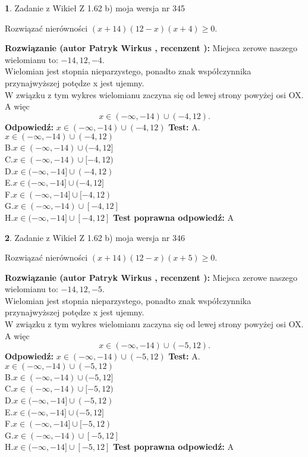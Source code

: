 \documentclass[12pt, a4paper]{article}
\theoremstyle{definition} %
\newtheorem{zad}{}
\newcommand{\zadStart}[1]{\begin{zad}#1\newline}
\newcommand{\zadStop}{\end{zad}}
\newcommand{\rozwStart}[2]{\noindent \textbf{Rozwiązanie (autor #1 , recenzent #2): }\newline}
\newcommand{\rozwStop}{\newline}
\newcommand{\odpStart}{\noindent \textbf{Odpowiedź:}\newline}
\newcommand{\odpStop}{\newline}
\newcommand{\testStart}{\noindent \textbf{Test:}\newline}
\newcommand{\testStop}{\newline}
\newcommand{\kluczStart}{\noindent \textbf{Test poprawna odpowiedź:}\newline}
\newcommand{\kluczStop}{\newline}
\begin{document}
\zadStart{Zadanie z Wikieł Z 1.62 b) moja wersja nr 345}

Rozwiązać nierówności $(x+14)(12-x)(x+4)\ge0$.
\zadStop
\rozwStart{Patryk Wirkus}{}
Miejsca zerowe naszego wielomianu to: $-14, 12, -4$.\\
Wielomian jest stopnia nieparzystego, ponadto znak współczynnika przy\linebreak najwyższej potędze x jest ujemny.\\ W związku z tym wykres wielomianu zaczyna się od lewej strony powyżej osi OX. A więc $$x \in (-\infty,-14) \cup (-4,12).$$
\rozwStop
\odpStart
$x \in (-\infty,-14) \cup (-4,12)$
\odpStop
\testStart
A.$x \in (-\infty,-14) \cup (-4,12)$\\
B.$x \in (-\infty,-14) \cup (-4,12]$\\
C.$x \in (-\infty,-14) \cup [-4,12)$\\
D.$x \in (-\infty,-14] \cup (-4,12)$\\
E.$x \in (-\infty,-14] \cup (-4,12]$\\
F.$x \in (-\infty,-14] \cup [-4,12)$\\
G.$x \in (-\infty,-14) \cup [-4,12]$\\
H.$x \in (-\infty,-14] \cup [-4,12]$
\testStop
\kluczStart
A
\kluczStop



\zadStart{Zadanie z Wikieł Z 1.62 b) moja wersja nr 346}

Rozwiązać nierówności $(x+14)(12-x)(x+5)\ge0$.
\zadStop
\rozwStart{Patryk Wirkus}{}
Miejsca zerowe naszego wielomianu to: $-14, 12, -5$.\\
Wielomian jest stopnia nieparzystego, ponadto znak współczynnika przy\linebreak najwyższej potędze x jest ujemny.\\ W związku z tym wykres wielomianu zaczyna się od lewej strony powyżej osi OX. A więc $$x \in (-\infty,-14) \cup (-5,12).$$
\rozwStop
\odpStart
$x \in (-\infty,-14) \cup (-5,12)$
\odpStop
\testStart
A.$x \in (-\infty,-14) \cup (-5,12)$\\
B.$x \in (-\infty,-14) \cup (-5,12]$\\
C.$x \in (-\infty,-14) \cup [-5,12)$\\
D.$x \in (-\infty,-14] \cup (-5,12)$\\
E.$x \in (-\infty,-14] \cup (-5,12]$\\
F.$x \in (-\infty,-14] \cup [-5,12)$\\
G.$x \in (-\infty,-14) \cup [-5,12]$\\
H.$x \in (-\infty,-14] \cup [-5,12]$
\testStop
\kluczStart
A
\kluczStop
\end{document}
